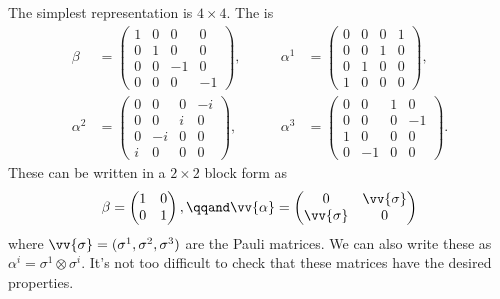 \documentclass[fleqn]{NotesClass}
\begin{document}
\begin{appendices}
        The simplest representation is \(4 \times 4\).
        The  is
        \begin{align}
            \beta &= 
            \begin{pmatrix}
                1 & 0 & 0 & 0\\
                0 & 1 & 0 & 0\\
                0 & 0 & -1 & 0\\
                0 & 0 & 0 & -1
            \end{pmatrix}
            , \qquad & \alpha^1 &=
            \begin{pmatrix}
                0 & 0 & 0 & 1\\
                0 & 0 & 1 & 0\\
                0 & 1 & 0 & 0\\
                1 & 0 & 0 & 0
            \end{pmatrix}
            ,\\
            \alpha^2 &= 
            \begin{pmatrix}
                0 & 0 & 0 & -i\\
                0 & 0 & i & 0\\
                0 & -i & 0 & 0\\
                i & 0 & 0 & 0
            \end{pmatrix}
            , \qquad & \alpha^3 &= 
            \begin{pmatrix}
                0 & 0 & 1 & 0\\
                0 & 0 & 0 &-1\\
                1 & 0 & 0 & 0\\
                0 & -1 & 0 & 0
            \end{pmatrix}
            .
        \end{align}
        These can be written in a \(2\times 2\) block form as
        \begin{equation}
            \beta = 
            \begin{pmatrix}
                1 & 0\\
                0 & 1
            \end{pmatrix}
            , \qqand \vv{\alpha} = 
            \begin{pmatrix}
                0 & \vv{\sigma}\\
                \vv{\sigma} & 0
            \end{pmatrix}
        \end{equation}
        where \(\vv{\sigma} = (\sigma^1, \sigma^2, \sigma^3)\) are the Pauli matrices.
        We can also write these as \(\alpha^i = \sigma^1 \otimes \sigma^i\).
        It's not too difficult to check that these matrices have the desired properties.
        

\end{appendices}
\end{document}
